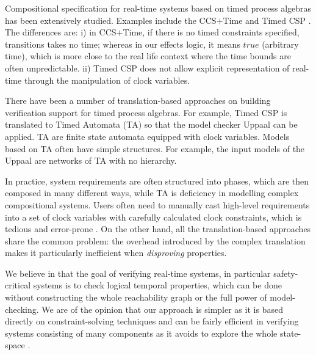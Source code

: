 \documentclass[acmsmall,10pt,review]{acmart}
\newcommand{\code}[1]{{\tt{\ensuremath{\m{#1}}}}}
\newcommand{\m}{\mathit}
\begin{document}
{Compositional specification for real-time systems based on timed process algebras has been extensively studied. Examples include the CCS\code{\text{+}}Time \cite{yi1991ccs} and Timed CSP \cite{dong2008timed}.  
The differences are: 
i) in CCS\code{\text{+}}Time, if there is no timed constraints specified, transitions takes no time; whereas in our effects logic, it means \code{true} (arbitrary time), which is more close to the real life context where the time bounds are often unpredictable.
ii) Timed CSP does not allow explicit representation of real-time through the manipulation of clock variables.



There have been a number of translation-based approaches on building verification support for timed process algebras. For example, Timed CSP \cite{dong2008timed} is translated to Timed Automata (TA) so that the model checker Uppaal can be \cite{DBLP:journals/sttt/LarsenPY97} applied. 
TA are finite state automata equipped with clock variables. Models based on TA often have simple structures. For example, the input models of the Uppaal are networks of TA with no hierarchy. 


In practice, system requirements are often structured into phases, which are then composed in many different ways, while TA is deficiency in modelling complex compositional systems. Users often need to manually cast high-level requirements into a set of clock variables with carefully calculated clock constraints, which is tedious and error-prone \cite{sun2013modeling}. 
On the other hand, all the translation-based approaches share the common problem: 
the overhead introduced by
the complex translation makes it particularly inefficient when \emph{disproving} properties. 

We believe in that the goal of verifying real-time systems, in particular safety-critical systems is to check logical temporal properties, which can be done without constructing the whole reachability graph or the full power of model-checking. We are of the opinion that our approach is simpler as it is based directly on constraint-solving techniques and can be fairly efficient in verifying systems consisting of many components as it avoids to explore the whole state-space \cite{song2020automated,yi1995automatic}.

}
\end{document}
